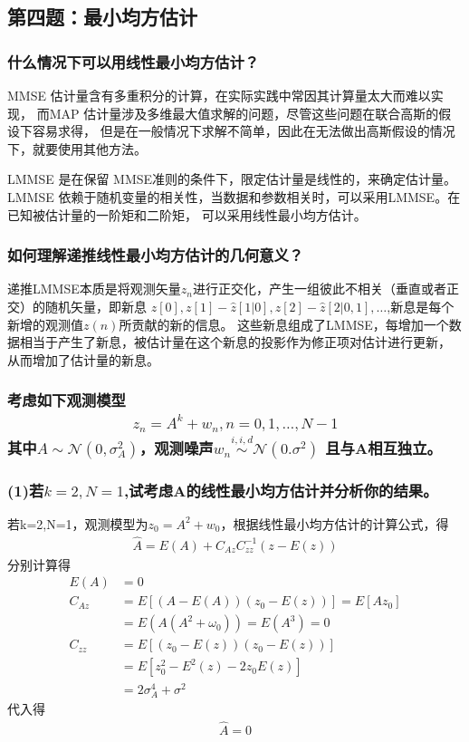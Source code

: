 \documentclass[fontset=windows]{article}
\numberwithin{figure}{section}
\begin{document}
\subsection{第四题：最小均方估计}
\subsubsection*{什么情况下可以用线性最小均方估计？}

MMSE 估计量含有多重积分的计算，在实际实践中常因其计算量太大而难以实现，
而MAP 估计量涉及多维最大值求解的问题，尽管这些问题在联合高斯的假设下容易求得，
但是在一般情况下求解不简单，因此在无法做出高斯假设的情况下，就要使用其他方法。

LMMSE 是在保留 MMSE准则的条件下，限定估计量是线性的，来确定估计量。
LMMSE 依赖于随机变量的相关性，当数据和参数相关时，可以采用LMMSE。在已知被估计量的一阶矩和二阶矩，
可以采用线性最小均方估计。

\subsubsection*{如何理解递推线性最小均方估计的几何意义？}

递推LMMSE本质是将观测矢量\(z_n\)进行正交化，产生一组彼此不相关（垂直或者正交）的随机矢量，即新息
\(z[0],z[1]-\hat{z} [1|0],z[2]-\hat{z}[2|0,1],\dots \),新息是每个新增的观测值\(z(n)\)所贡献的新的信息。
这些新息组成了LMMSE，每增加一个数据相当于产生了新息，被估计量在这个新息的投影作为修正项对估计进行更新，
从而增加了估计量的新息。

\subsubsection*{考虑如下观测模型
	\begin{align*}
		z_n=A^k+w_n,n=0,1,\dots,N-1
	\end{align*}
	其中\(A\sim \mathcal{N}(0,\sigma^2_A)\)，观测噪声\(w_n\overset{i,i,d}{\sim}\mathcal{N}(0.\sigma^2)\)
	且与A相互独立。}
\subsubsection*{(1)若\(k=2,N=1\),试考虑A的线性最小均方估计并分析你的结果。}

若k=2,N=1，观测模型为\(z_0=A^2+w_0\)，根据线性最小均方估计的计算公式，得
\begin{align*}
	\hat{A}=E(A)+C_{Az}C_{zz}^{-1}(z-E(z))
\end{align*}
分别计算得
\begin{align*}
	E(A)   & =0                             \\
	C_{Az} & =E[(A-E(A))(z_0-E(z))]=E[Az_0] \\
	       & =E(A(A^2+\omega_0))=E(A^3)=0   \\
	C_{zz} & =E[(z_0-E(z))(z_0-E(z))]       \\
	       & =E[z_0^2-E^2(z)-2z_0E(z)]      \\
	       & =2\sigma_A^4+\sigma^2
\end{align*}
代入得
\begin{align*}
	\hat{A}=0
\end{align*}
\end{document}
